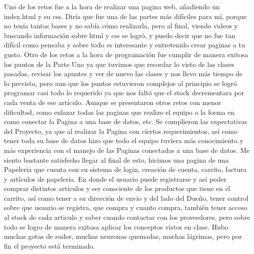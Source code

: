 \documentclass[letterpaper,12pt]{article}
\begin{document}
\begin{itemize}
		Uno de los retos fue a la hora de realizar una pagina web, añadiendo un index.html y su css. Diría que fue una de las partes más difíciles para mí, porque no tenía tantas bases y no sabía cómo realizarla, pero al final, viendo videos y buscando información sobre html y css se logró, y puedo decir que no fue tan difícil como pensaba y sobre todo es interesante y entretenido crear paginas a tu gusto. 
		Otro de los retos a la hora de programación fue cumplir de manera exitosa los puntos de la Parte Uno ya que tuvimos que recordar lo visto de las clases pasadas, revisar los apuntes y ver de nuevo las clases y nos llevo más tiempo de lo previsto, pero aun que los puntos estuvieron complejos al principio se logró programar casi todo lo requerido ya que nos faltó que el stock decrementara por cada venta de ese artículo.    
		Aunque se presentaron otros retos con menor dificultad, como enlazar todas las paginas que realizo el equipo o la forma en como conectar la Pagina a una base de datos, etc. Se cumplieron las expectativas del Proyecto, ya que al realizar la Pagina con ciertos requerimientos, así como tener toda su base de datos hizo que todo el equipo tuviera más conocimiento y más experiencia con el manejo de las Paginas conectadas a una base de datos.
		Me siento bastante satisfecho llegar al final de esto, hicimos una pagina de una Papeleria que cuenta con su sistema de login, creación de cuenta, carrito, factura y artículos de papeleria. En donde el usuario puede registrarse y así poder comprar distintos artículos y ser consciente de los productos que tiene en el carrito, así como tener a su dirección de envio y del lado del Dueño, tener control sobre que usuario se registra, que compra y cuanto compra, también tener acceso al stock de cada articulo y saber cuando contactar con los proveedores, pero sobre todo se logro de manera exitosa aplicar los conceptos vistos en clase. 
		Hubo muchas gotas de sudor, muchas neuronas quemadas, muchas lágrimas, pero por fin el proyecto está terminado.
	\end{itemize}
	
\end{document}
